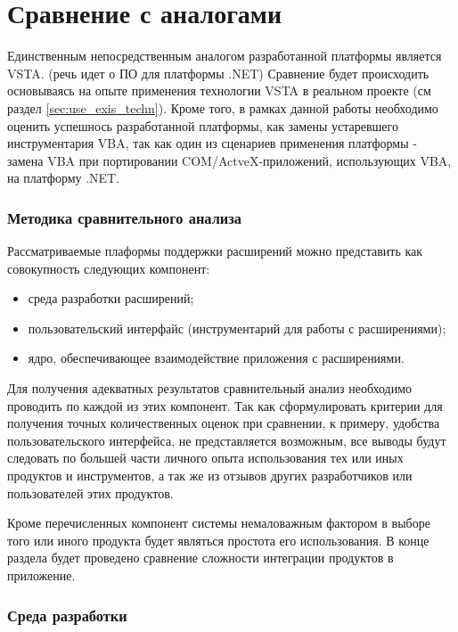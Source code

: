 \section{Сравнение с аналогами}

Единственным непосредственным аналогом разработанной платформы является VSTA. (речь идет о ПО для платформы .NET)  Сравнение будет происходить основываясь на опыте применения технологии VSTA в реальном проекте (см раздел \ref{sec:use_exis_techn}). Кроме того, в рамках данной работы необходимо оценить успешнось разработанной платформы, как замены устаревшего инструментария VBA, так как один из сценариев применения платформы - замена VBA при портировании COM/ActveX-приложений, использующих VBA, на платформу .NET.

\subsubsection{Методика сравнительного анализа}

Рассматриваемые плаформы поддержки расширений можно представить как совокупность следующих компонент:

\begin{itemize}
   \item среда разработки расширений;
   \item пользовательский интерфайс (инструментарий для работы с расширениями);
   \item ядро, обеспечивающее взаимодействие приложения с расширениями.
\end{itemize}

Для получения адекватных результатов сравнительный анализ необходимо проводить по каждой из этих компонент. Так как сформулировать критерии для получения точных количественных оценок при сравнении, к примеру, удобства пользовательского интерфейса, не представляется возможным, все выводы будут следовать по большей части личного опыта использования тех или иных продуктов и инструментов, а так же из отзывов других разработчиков или пользователей этих продуктов.

Кроме перечисленных компонент системы немаловажным фактором в выборе того или иного продукта будет являться простота его использования. В конце раздела будет проведено сравнение сложности интеграции продуктов в приложение.

\subsubsection{Среда разработки}

